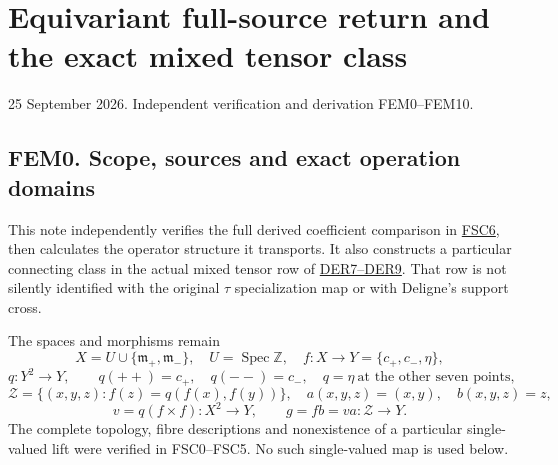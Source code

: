\section{Equivariant full-source return and the exact mixed tensor
class}\label{equivariant-full-source-return-and-the-exact-mixed-tensor-class}

25 September 2026. Independent verification and derivation FEM0--FEM10.

\subsection{FEM0. Scope, sources and exact operation
domains}\label{fem0.-scope-sources-and-exact-operation-domains}

This note independently verifies the full derived coefficient comparison
in
\href{https://github.com/KokunoYumeto/zeta-function-research-reader/blob/main/workbenches/splitzero-tandem/continuations/20260925-full-source-tensor-and-original-divisor/counterfactual/DERIVED_RETURN_FULL_SOURCE_CORRESPONDENCE.md}{FSC6},
then calculates the operator structure it transports. It also constructs
a particular connecting class in the actual mixed tensor row of
\href{https://github.com/KokunoYumeto/zeta-function-research-reader/blob/main/workbenches/splitzero-tandem/continuations/20260925-full-source-tensor-and-original-divisor/counterfactual/DIAGONAL_EXTRAORDINARY_RETURN.md}{DER7--DER9}.
That row is not silently identified with the original \(\tau\)
specialization map or with Deligne's support cross.

The spaces and morphisms remain \[
X=U\cup\{\mathfrak m_+,\mathfrak m_-\},\quad U=\operatorname{Spec}\mathbb Z,
\quad f:X\to Y=\{c_+,c_-,\eta\},
\] \[
q:Y^2\to Y,\qquad q(++ )=c_+,\quad q(--)=c_-,
\quad q=\eta\ \text{at the other seven points},
\] \[
\mathcal Z=\{(x,y,z):f(z)=q(f(x),f(y))\},\quad
a(x,y,z)=(x,y),\quad b(x,y,z)=z,
\] \[
v=q(f\times f):X^2\to Y,\qquad g=fb=va:\mathcal Z\to Y.
\] The complete topology, fibre descriptions and nonexistence of a
particular single-valued lift were verified in FSC0--FSC5. No such
single-valued map is used below.


